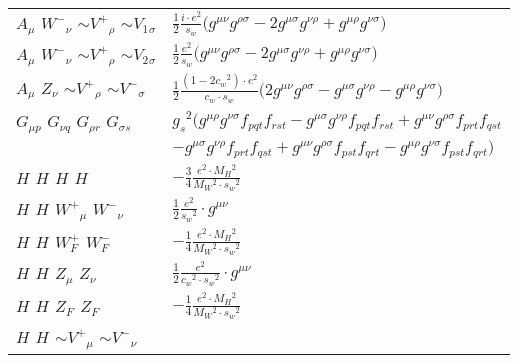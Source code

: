 \begin{center}
\begin{tabular}{|l|l|}
${A}_{\mu }$ \phantom{-} $W^-{}_{\nu }$ \phantom{-} $\sim V^+{}_{\rho }$ \phantom{-} $\sim V_1{}_{\sigma }$ \phantom{-}  &
	$\frac{1}{2}\frac{ i \cdot e{}^2 }{ s_w}\big(g^{\mu \nu} g^{\rho \sigma} -2g^{\mu \sigma} g^{\nu \rho} +g^{\mu \rho} g^{\nu \sigma} \big)$\\[2mm]
${A}_{\mu }$ \phantom{-} $W^-{}_{\nu }$ \phantom{-} $\sim V^+{}_{\rho }$ \phantom{-} $\sim V_2{}_{\sigma }$ \phantom{-}  &
	$\frac{1}{2}\frac{ e{}^2 }{ s_w}\big(g^{\mu \nu} g^{\rho \sigma} -2g^{\mu \sigma} g^{\nu \rho} +g^{\mu \rho} g^{\nu \sigma} \big)$\\[2mm]
${A}_{\mu }$ \phantom{-} ${Z}_{\nu }$ \phantom{-} $\sim V^+{}_{\rho }$ \phantom{-} $\sim V^-{}_{\sigma }$ \phantom{-}  &
	$\frac{1}{2}\frac{ (1-2 c_w {}^2) \cdot e{}^2 }{ c_w \cdot s_w}\big(2g^{\mu \nu} g^{\rho \sigma} -g^{\mu \sigma} g^{\nu \rho} -g^{\mu \rho} g^{\nu \sigma} \big)$\\[2mm]
${G}_{\mu p }$ \phantom{-} ${G}_{\nu q }$ \phantom{-} ${G}_{\rho r }$ \phantom{-} ${G}_{\sigma s }$ \phantom{-}  &
	$ g_s{}^2 \big(g^{\mu \rho} g^{\nu \sigma} f_{p q t} f_{r s t} -g^{\mu \sigma} g^{\nu \rho} f_{p q t} f_{r s t} +g^{\mu \nu} g^{\rho \sigma} f_{p r t} f_{q s t} $ \\[2mm]
  & $-g^{\mu \sigma} g^{\nu \rho} f_{p r t} f_{q s t} +g^{\mu \nu} g^{\rho \sigma} f_{p s t} f_{q r t} -g^{\mu \rho} g^{\nu \sigma} f_{p s t} f_{q r t} \big)$\\[2mm]
${H}_{}$ \phantom{-} ${H}_{}$ \phantom{-} ${H}_{}$ \phantom{-} ${H}_{}$ \phantom{-}  &
	$-\frac{3}{4}\frac{ e{}^2  \cdot M_H{}^2 }{ M_W{}^2  \cdot s_w{}^2 }$\\[2mm]
${H}_{}$ \phantom{-} ${H}_{}$ \phantom{-} $W^+{}_{\mu }$ \phantom{-} $W^-{}_{\nu }$ \phantom{-}  &
	$\frac{1}{2}\frac{ e{}^2 }{ s_w{}^2 }\cdot g^{\mu \nu} $\\[2mm]
${H}_{}$ \phantom{-} ${H}_{}$ \phantom{-} $W^+_F{}_{}$ \phantom{-} $W^-_F{}_{}$ \phantom{-}  &
	$-\frac{1}{4}\frac{ e{}^2  \cdot M_H{}^2 }{ M_W{}^2  \cdot s_w{}^2 }$\\[2mm]
${H}_{}$ \phantom{-} ${H}_{}$ \phantom{-} ${Z}_{\mu }$ \phantom{-} ${Z}_{\nu }$ \phantom{-}  &
	$\frac{1}{2}\frac{ e{}^2 }{ c_w{}^2  \cdot s_w{}^2 }\cdot g^{\mu \nu} $\\[2mm]
${H}_{}$ \phantom{-} ${H}_{}$ \phantom{-} $Z_F{}_{}$ \phantom{-} $Z_F{}_{}$ \phantom{-}  &
	$-\frac{1}{4}\frac{ e{}^2  \cdot M_H{}^2 }{ M_W{}^2  \cdot s_w{}^2 }$\\[2mm]
${H}_{}$ \phantom{-} ${H}_{}$ \phantom{-} $\sim V^+{}_{\mu }$ \phantom{-} $\sim V^-{}_{\nu }$ \phantom{-}  &

\end{tabular}
\end{center}

